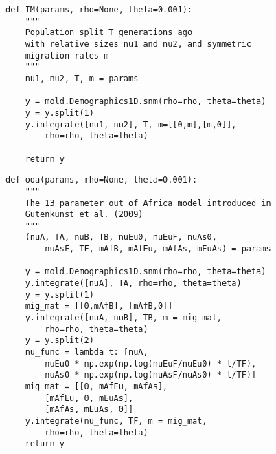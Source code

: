\documentclass[11pt]{article}
\begin{document}
\begin{lstlisting}[caption={\textbf{IM model:} One population splits into two some time in the past. Each population can have a new size, with symmetric and continuous migration between populations.}, float, label={lst:IM}]
def IM(params, rho=None, theta=0.001):
    """
    Population split T generations ago
    with relative sizes nu1 and nu2, and symmetric
    migration rates m
    """
    nu1, nu2, T, m = params
    
    y = mold.Demographics1D.snm(rho=rho, theta=theta)
    y = y.split(1)
    y.integrate([nu1, nu2], T, m=[[0,m],[m,0]],
        rho=rho, theta=theta)
    
    return y
\end{lstlisting}

\begin{lstlisting}[caption={\textbf{Out of Africa model:} The \citet{Gutenkunst2009} Out-of-Africa model, with 13 parameters as originally defined. This model has three representative continental populations (often YRI, CEU, and CHB), with an out of Africa split between Eurasian and African populations, followed by a split between European and East Asian populations, with symmetric migration rates and size changes along each branch.}, float, label={lst:ooa}]
def ooa(params, rho=None, theta=0.001):
    """
    The 13 parameter out of Africa model introduced in
    Gutenkunst et al. (2009)
    """
    (nuA, TA, nuB, TB, nuEu0, nuEuF, nuAs0, 
        nuAsF, TF, mAfB, mAfEu, mAfAs, mEuAs) = params
    
    y = mold.Demographics1D.snm(rho=rho, theta=theta)
    y.integrate([nuA], TA, rho=rho, theta=theta)
    y = y.split(1)
    mig_mat = [[0,mAfB], [mAfB,0]]
    y.integrate([nuA, nuB], TB, m = mig_mat,
        rho=rho, theta=theta)
    y = y.split(2)
    nu_func = lambda t: [nuA,
        nuEu0 * np.exp(np.log(nuEuF/nuEu0) * t/TF),
        nuAs0 * np.exp(np.log(nuAsF/nuAs0) * t/TF)]
    mig_mat = [[0, mAfEu, mAfAs],
        [mAfEu, 0, mEuAs],
        [mAfAs, mEuAs, 0]]
    y.integrate(nu_func, TF, m = mig_mat, 
        rho=rho, theta=theta)
    return y
\end{lstlisting}
\end{document}
